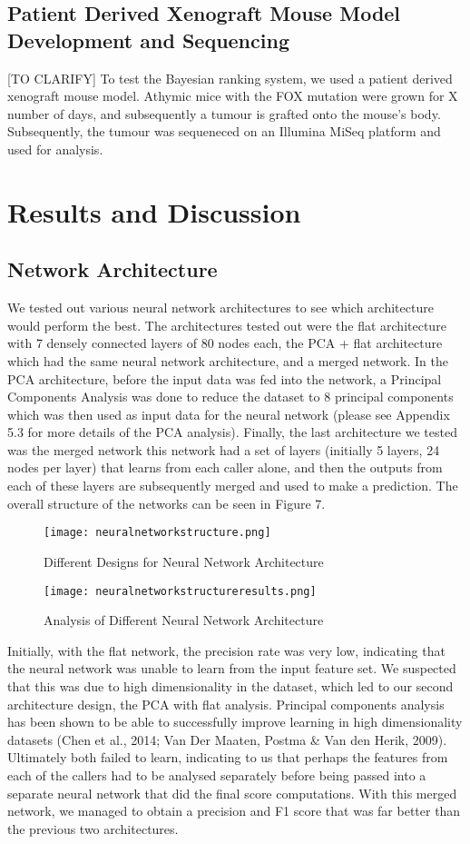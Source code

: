 \documentclass{article}
\begin{document}
\subsection{Patient Derived Xenograft Mouse Model Development and Sequencing}
[TO CLARIFY] To test the Bayesian ranking system, we used a patient derived xenograft mouse model. Athymic mice with the FOX mutation were grown for X number of days, and subsequently a tumour is grafted onto the mouse's body. Subsequently, the tumour was sequeneced on an Illumina MiSeq platform and used for analysis. 

\newpage
\section{Results and Discussion}

\subsection{Network Architecture}
We tested out various neural network architectures to see which architecture would perform the best. The architectures tested out were the flat architecture with 7 densely connected layers of 80 nodes each, the PCA + flat architecture which had the same neural network architecture, and a merged network. In the PCA architecture, before the input data was fed into the network, a Principal Components Analysis was done to reduce the dataset to 8 principal components which was then used as input data for the neural network (please see Appendix 5.3 for more details of the PCA analysis). Finally, the last architecture we tested was the merged network this network had a set of layers (initially 5 layers, 24 nodes per layer) that learns from each caller alone, and then the outputs from each of these layers are subsequently merged and used to make a prediction. The overall structure of the networks can be seen in Figure 7. 
\begin{figure}[H]
\texttt{[image: neuralnetworkstructure.png]}
\centering
\caption{Different Designs for Neural Network Architecture}
\end{figure}
\begin{figure}[H]
\texttt{[image: neuralnetworkstructureresults.png]}
\centering
\caption{Analysis of Different Neural Network Architecture}
\end{figure}
Initially, with the flat network, the precision rate was very low, indicating that the neural network was unable to learn from the input feature set. We suspected that this was due to high dimensionality in the dataset, which led to our second architecture design, the PCA with flat analysis. Principal components analysis has been shown to be able to successfully improve learning in high dimensionality datasets (Chen et al., 2014; Van Der Maaten, Postma \& Van den Herik, 2009). Ultimately both failed to learn, indicating to us that perhaps the features from each of the callers had to be analysed separately before being passed into a separate neural network that did the final score computations. With this merged network, we managed to obtain a precision and F1 score that was far better than the previous two architectures. 
\end{document}
